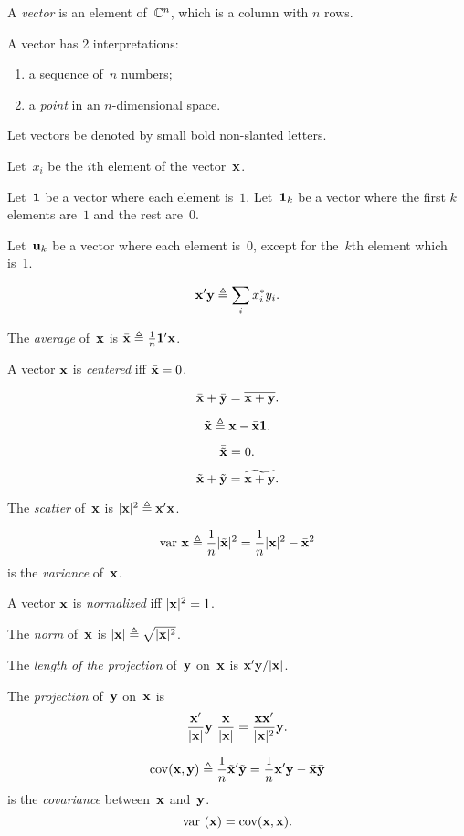 \documentclass[10pt,a4paper]{article}
\theoremstyle{plain} \newtheorem{Lem}{Lemma}
\begin{document}
A {\em vector} is an element of~$\mathbb C^n$, which is a column with $n$ rows.

A vector has 2 interpretations: 
\begin{enumerate} 
  \item a sequence of~$n$ numbers; 
  \item a {\em point} in an $n$-dimensional space.
\end{enumerate}


Let vectors be denoted by small bold non-slanted letters.

Let~$x_i$ be the $i$th element of the vector~$\mathbf x$.

Let~$\mathbf 1$ be a vector where each element is~$1$.
Let~$\mathbf 1_k$ be a vector where the first $k$ elements are~$1$ and the rest are~$0$.

Let~$\mathbf u_k$ be a vector where each element is~0, except for the~$k$th element which is~1.

$$ \mathbf x' \mathbf y \triangleq \sum_i x_i^* y_i. $$

The {\em average} of~$\mathbf x$ is $\bar {\mathbf x} \triangleq \frac 1 n \mathbf 1' \mathbf x$.

A vector $\mathbf x$ is {\em centered} iff $\bar{\mathbf x} = 0$.

$$ \bar {\mathbf x} + \bar {\mathbf y} = \overline {\mathbf x + \mathbf y}. $$

$$ \tilde {\mathbf x} \triangleq \mathbf x - \bar {\mathbf x} {\mathbf 1}. $$

$$\bar {\tilde {\mathbf x}} = 0. $$

$$ \tilde {\mathbf x} + \tilde {\mathbf y} = \widetilde {\mathbf x + \mathbf y}. $$

The {\em scatter} of~$\mathbf x$ is $|\mathbf x|^2 \triangleq \mathbf x' \mathbf x$.

$$ \mathrm {var} \  \mathbf x \triangleq \frac 1 n |\tilde {\mathbf x}|^2 = \frac 1 n |\mathbf x|^2 - \bar{\mathbf x}^2 $$ 
is the {\em variance} of~$\mathbf x$.

A vector $\mathbf x$ is {\em normalized} iff $|\mathbf x|^2 = 1$.

The {\em norm} of~$\mathbf x$ is $|\mathbf x| \triangleq \sqrt{|\mathbf x|^2}$.

The {\em length of the projection} of~$\mathbf y$ on~$\mathbf x$ is $\mathbf x' \mathbf y / |\mathbf x|$.

The {\em projection} of~$\mathbf y$ on~$\mathbf x$ is 
\begin{equation} \label{vecProjection}
  \frac {\mathbf x'} {|\mathbf x|}  \mathbf y \ \frac {\mathbf x} {|\mathbf x|} = \frac {\mathbf x \mathbf x'} {|\mathbf x|^2} \mathbf y.
\end{equation}

$$ \mathrm {cov} (\mathbf x, \mathbf y) \triangleq \frac 1 n \tilde {\mathbf x}' \tilde {\mathbf y} = \frac 1 n \mathbf x' \mathbf y - \bar{\mathbf x} \bar{\mathbf y} $$
is the {\em covariance} between~$\mathbf x$ and~$\mathbf y$.
$$ \mathrm {var} \  (\mathbf x) = \mathrm {cov}(\mathbf x,\mathbf x). $$
\end{document}
